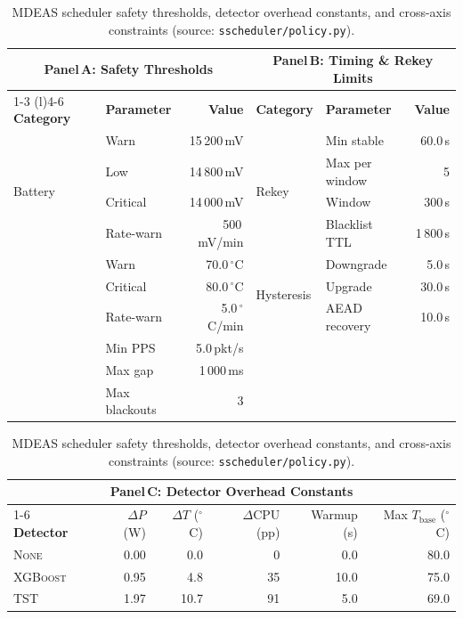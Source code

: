 \begin{table}[!t]
\centering
\footnotesize
\setlength{\tabcolsep}{4pt}
\caption{MDEAS scheduler safety thresholds, detector overhead constants,
and cross-axis constraints
(source: \texttt{sscheduler/policy.py}).}
\label{tab:scheduler-constants}
\renewcommand{\arraystretch}{1.15}
\begin{tabular}{@{}llr@{\hskip 12pt}llr@{}}
\toprule
\multicolumn{3}{c}{\textbf{Panel\,A: Safety Thresholds}} &
\multicolumn{3}{c}{\textbf{Panel\,B: Timing \& Rekey Limits}} \\
\cmidrule(r){1-3} \cmidrule(l){4-6}
\textbf{Category} & \textbf{Parameter} & \textbf{Value} &
\textbf{Category} & \textbf{Parameter} & \textbf{Value} \\
\midrule
\multirow{4}{*}{Battery}
 & Warn           & 15\,200\,mV     & \multirow{4}{*}{Rekey}      & Min stable    & 60.0\,s   \\
 & Low            & 14\,800\,mV     &                              & Max per window & 5         \\
 & Critical       & 14\,000\,mV     &                              & Window        & 300\,s    \\
 & Rate-warn      & 500\,mV/min     &                              & Blacklist TTL & 1\,800\,s \\
\addlinespace
\multirow{3}{*}{Thermal}
 & Warn           & 70.0\,$^\circ$C &
\multirow{3}{*}{Hysteresis}
                                     & Downgrade     & 5.0\,s    \\
 & Critical       & 80.0\,$^\circ$C &                              & Upgrade       & 30.0\,s   \\
 & Rate-warn      & 5.0\,$^\circ$C/min &                           & AEAD recovery & 10.0\,s   \\
\addlinespace
\multirow{3}{*}{Link Quality}
 & Min PPS        & 5.0\,pkt/s      & & & \\
 & Max gap        & 1\,000\,ms      & & & \\
 & Max blackouts  & 3               & & & \\
\bottomrule
\end{tabular}

\vspace{6pt}

\begin{tabular}{@{}lrrrrr@{}}
\toprule
\multicolumn{6}{c}{\textbf{Panel\,C: Detector Overhead Constants}} \\
\cmidrule{1-6}
\textbf{Detector} & {$\Delta P$ (W)} & {$\Delta T$ ($^\circ$C)} & {$\Delta$CPU (pp)} & {Warmup (s)} & {Max $T_{\text{base}}$ ($^\circ$C)} \\
\midrule
\textsc{None}    & 0.00 & 0.0  &  0 &  0.0 & 80.0 \\
\textsc{XGBoost} & 0.95 & 4.8  & 35 & 10.0 & 75.0 \\
\textsc{TST}     & 1.97 & 10.7 & 91 &  5.0 & 69.0 \\
\bottomrule
\end{tabular}


\end{table}
